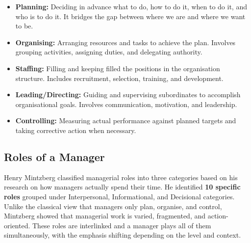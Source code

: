 \documentclass[12pt,a4paper]{article}
\begin{document}
\begin{itemize}[leftmargin=*, itemsep=3pt]
  \item \textbf{Planning:} Deciding in advance what to do, how to do it, when to do it, and who is to do it. It bridges the gap between where we are and where we want to be.
  \item \textbf{Organising:} Arranging resources and tasks to achieve the plan. Involves grouping activities, assigning duties, and delegating authority.
  \item \textbf{Staffing:} Filling and keeping filled the positions in the organisation structure. Includes recruitment, selection, training, and development.
  \item \textbf{Leading/Directing:} Guiding and supervising subordinates to accomplish organisational goals. Involves communication, motivation, and leadership.
  \item \textbf{Controlling:} Measuring actual performance against planned targets and taking corrective action when necessary.
\end{itemize}

\subsection{Roles of a Manager}
Henry Mintzberg classified managerial roles into three categories based on his research on how managers actually spend their time. He identified \textbf{10 specific roles} grouped under Interpersonal, Informational, and Decisional categories. Unlike the classical view that managers only plan, organise, and control, Mintzberg showed that managerial work is varied, fragmented, and action-oriented. These roles are interlinked and a manager plays all of them simultaneously, with the emphasis shifting depending on the level and context.
\end{document}
